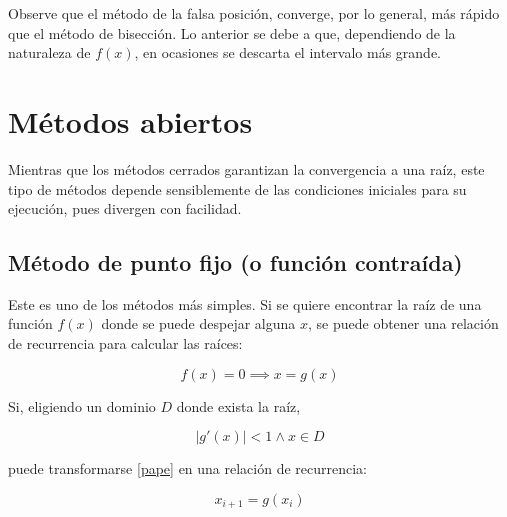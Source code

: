 Observe que el método de la falsa posición, converge, por lo general, más
rápido que el método de bisección. Lo anterior se debe a que, dependiendo de la
naturaleza de $f(x)$, en ocasiones se descarta el intervalo más grande.


\section{Métodos abiertos}

Mientras que los métodos cerrados garantizan la convergencia a una raíz, este
tipo de métodos depende sensiblemente de las condiciones iniciales para su
ejecución, pues divergen con facilidad.

\subsection{Método de punto fijo (o función contraída)}

Este es uno de los métodos más simples. Si se quiere encontrar la raíz de una
función $f(x)$ donde se puede despejar alguna $x$, se puede obtener una
relación de recurrencia para calcular las raíces:

\begin{equation}\label{pape}
	f(x) = 0 \implies \boxed{x = g(x)}
\end{equation}

Si, eligiendo un dominio $D$ donde exista la raíz,

\[
	\left| g'(x) \right| < 1 \land x \in D
\]

puede transformarse \ref{pape} en una relación de recurrencia:

\[
	x_{i+1} = g(x_i)
\]

